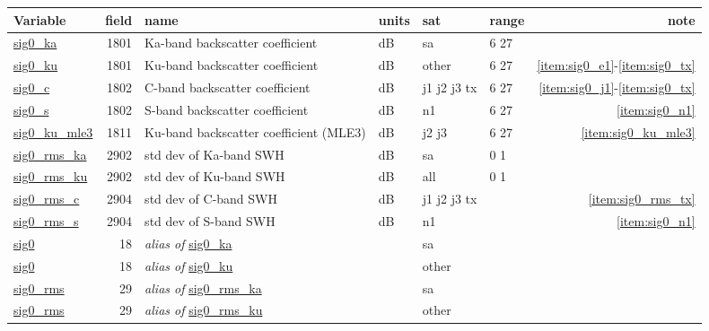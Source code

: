 \documentclass[a4paper,11pt,openany,natbib,nomargin]{thesis}
\makeatletter
\newcommand\var[1]{\url{#1}\index{variables!#1@\protect\url{#1}}}
\newcommand\alias[1]{\emph{alias of} \var{#1}}
\newenvironment{vartable}{
\begin{table}[ht]
\small
\begin{tabular}{lrllllr}
\hline
Variable & field & name & units & sat & range & note \\
\hline
}{
\hline
\end{tabular}
\end{table}
}
\makeatother
\begin{document}
\begin{vartable}
\var{sig0_ka} & 1801 & Ka-band backscatter coefficient & dB & sa & 6 27 & \\
\var{sig0_ku} & 1801 & Ku-band backscatter coefficient & dB & other & 6 27 & \ref{item:sig0_e1}-\ref{item:sig0_tx} \\
\var{sig0_c} & 1802 & C-band backscatter coefficient & dB & j1 j2 j3 tx & 6 27 & \ref{item:sig0_j1}-\ref{item:sig0_tx} \\
\var{sig0_s} & 1802 & S-band backscatter coefficient & dB & n1 & 6 27 & \ref{item:sig0_n1} \\
\var{sig0_ku_mle3} & 1811 & Ku-band backscatter coefficient (MLE3) & dB & j2 j3 & 6 27 & \ref{item:sig0_ku_mle3} \\
\hline
\var{sig0_rms_ka} & 2902 & std dev of Ka-band SWH & dB & sa & 0 1 & \\
\var{sig0_rms_ku} & 2902 & std dev of Ku-band SWH & dB & all & 0 1 & \\
\var{sig0_rms_c} & 2904 & std dev of C-band SWH & dB & j1 j2 j3 tx & & \ref{item:sig0_rms_tx} \\
\var{sig0_rms_s} & 2904 & std dev of S-band SWH & dB & n1 & & \ref{item:sig0_n1} \\
\hline
\var{sig0} & 18 & \alias{sig0_ka} && sa && \\
\var{sig0} & 18 & \alias{sig0_ku} && other && \\
\hline
\var{sig0_rms} & 29 & \alias{sig0_rms_ka} && sa && \\
\var{sig0_rms} & 29 & \alias{sig0_rms_ku} && other && \\
\end{vartable}
\end{document}
